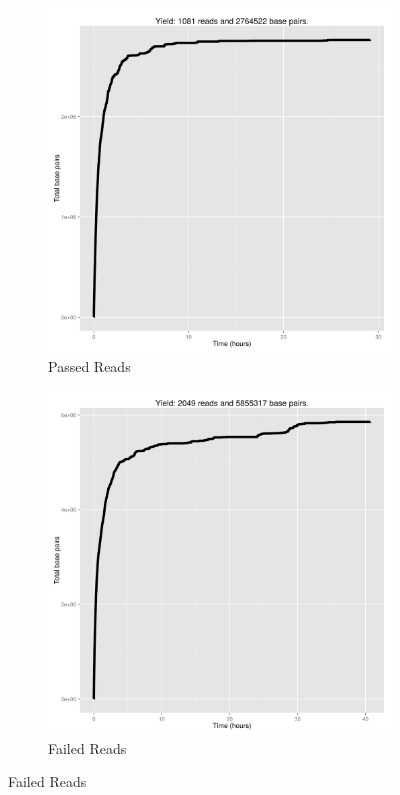 \begin{figure}[h!]
  \begin{subfigure}[b]{0.45\textwidth}
    \includegraphics[width=\textwidth]{cumnucpass}
    \caption{Passed Reads}
  \end{subfigure}
  \begin{subfigure}[b]{0.45\textwidth}
    \includegraphics[width=\textwidth]{cumnucfail}
    \caption{Failed Reads}
  \end{subfigure}
\end{figure}
